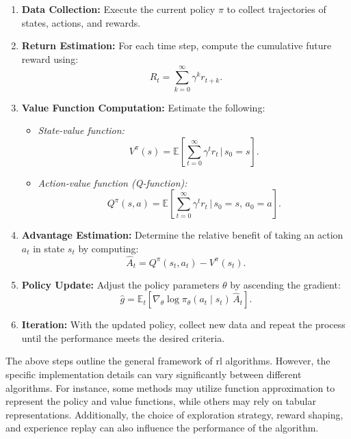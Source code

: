 \begin{enumerate}
    \item \textbf{Data Collection:} Execute the current policy \(\pi\) to collect trajectories of states, actions, and rewards.
    \item \textbf{Return Estimation:} For each time step, compute the cumulative future reward using:
    \begin{equation}
    R_t = \sum_{k=0}^{\infty} \gamma^k r_{t+k}.
    \end{equation}
    \item \textbf{Value Function Computation:} Estimate the following:
    \begin{itemize}
        \item \emph{State-value function:}
        \begin{equation}
        V^\pi(s) = \mathbb{E}\left[\sum_{t=0}^{\infty} \gamma^t r_t \,\bigg|\, s_0 = s\right].
        \end{equation}
        \item \emph{Action-value function (Q-function):}
        \begin{equation}
        Q^\pi(s, a) = \mathbb{E}\left[\sum_{t=0}^{\infty} \gamma^t r_t \,\bigg|\, s_0 = s,\, a_0 = a\right].
        \end{equation}
    \end{itemize}
    \item \textbf{Advantage Estimation:} Determine the relative benefit of taking an action \(a_t\) in state \(s_t\) by computing:
    \begin{equation}
    \hat{A}_t = Q^\pi(s_t, a_t) - V^\pi(s_t).
    \end{equation}
    \item \textbf{Policy Update:} Adjust the policy parameters \(\theta\) by ascending the gradient:
    \begin{equation}
    \hat{g} = \mathbb{E}_t\left[\nabla_\theta \log \pi_\theta(a_t \mid s_t) \, \hat{A}_t\right].
    \end{equation}
    \item \textbf{Iteration:} With the updated policy, collect new data and repeat the process until the performance meets the desired criteria.
\end{enumerate}

The above steps outline the general framework of \gls{rl} algorithms. However, the specific implementation details can vary significantly between different algorithms. For instance, some methods may utilize function approximation to represent the policy and value functions, while others may rely on tabular representations. Additionally, the choice of exploration strategy, reward shaping, and experience replay can also influence the performance of the algorithm.

